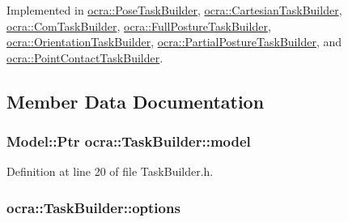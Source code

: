 Implemented in \hyperlink{classocra_1_1PoseTaskBuilder_aafc5b611352f7cbebecaa51cf534c68c}{ocra\+::\+Pose\+Task\+Builder}, \hyperlink{classocra_1_1CartesianTaskBuilder_a679842b95d6f7296a466636fd21bbbb8}{ocra\+::\+Cartesian\+Task\+Builder}, \hyperlink{classocra_1_1ComTaskBuilder_af9cfac995156297324ccbee1900f891c}{ocra\+::\+Com\+Task\+Builder}, \hyperlink{classocra_1_1FullPostureTaskBuilder_a5bae08175fd730b46004ddfccc9a1d8b}{ocra\+::\+Full\+Posture\+Task\+Builder}, \hyperlink{classocra_1_1OrientationTaskBuilder_a491f3d3db66afb5b5e3230983b4b15c9}{ocra\+::\+Orientation\+Task\+Builder}, \hyperlink{classocra_1_1PartialPostureTaskBuilder_acf2b5f880dc19e43356552b348d8a010}{ocra\+::\+Partial\+Posture\+Task\+Builder}, and \hyperlink{classocra_1_1PointContactTaskBuilder_a88d7c619f00708c1b3472ee7dc373f96}{ocra\+::\+Point\+Contact\+Task\+Builder}.



\subsection{Member Data Documentation}
\subsubsection[{\texorpdfstring{model}{model}}]{\setlength{\rightskip}{0pt plus 5cm}Model\+::\+Ptr ocra\+::\+Task\+Builder\+::model\hspace{0.3cm}{\ttfamily [protected]}}\hypertarget{classocra_1_1TaskBuilder_af612ab3b2881a7d472efabb650b23caf}{}\label{classocra_1_1TaskBuilder_af612ab3b2881a7d472efabb650b23caf}


Definition at line 20 of file Task\+Builder.\+h.

\subsubsection[{\texorpdfstring{options}{options}}]{ ocra\+::\+Task\+Builder\+::options\hspace{0.3cm}{\ttfamily [protected]}}\hypertarget{classocra_1_1TaskBuilder_a93ad03ab72579612f7ec5fe57b5df145}{}\label{classocra_1_1TaskBuilder_a93ad03ab72579612f7ec5fe57b5df145}


